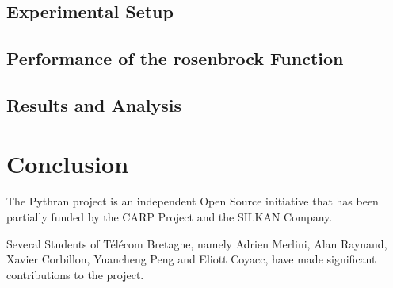 \documentclass[10pt, preprint]{sigplanconf}
\begin{document}
\subsection{Experimental Setup}

\subsection{Performance of the rosenbrock Function}

\subsection{Results and Analysis}

\section*{Conclusion}

\acks

The Pythran project is an independent Open Source initiative that has been
partially funded by the CARP Project and the SILKAN Company.

Several Students of Télécom Bretagne, namely Adrien Merlini, Alan Raynaud,
Xavier Corbillon, Yuancheng Peng and Eliott Coyacc, have made significant
contributions to the project.




\end{document}
